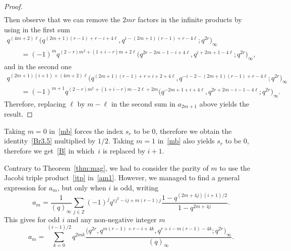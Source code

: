 \documentclass[pdftex]{sigma}
\numberwithin{equation}{section}
\begin{document}
\begin{proof}
\begin{align*}
\end{align*}
Then observe that we can remove the $2mr$ factors in the infinite products by using in the first sum
\begin{gather*}
q^{(4m+2)\ell}\bigl(q^{(2m+1)(r-1)+r-i+4\ell},q^{i-(2m+1)(r-1)+r-4\ell};q^{2r}\bigr)_\infty\\
\qquad=(-1)^mq^{(2-r)m^2+(1+i-r)m+2\ell}\bigl(q^{2r-2m-1-i+4\ell},q^{i+2m+1-4\ell};q^{2r}\bigr)_\infty,
\end{gather*}
and in the second one
\begin{gather*}
q^{(2m+1)(i+1)+(4m+2)\ell}\bigl(q^{(2m+1)(r-1)+r+i+2+4\ell},q^{-i-2-(2m+1)(r-1)+r-4\ell};q^{2r}\bigr)_\infty\\
\qquad=(-1)^{m+1}q^{(2-r)m^2+(1+i-r)m-2\ell+2m}\bigl(q^{-2m+1+i+4\ell},q^{2r+2m-i-1-4\ell};q^{2r}\bigr)_\infty.
\end{gather*}
Therefore, replacing $\ell$ by $m-\ell$ in the second sum in $a_{2m+1}$ above yields the result.
\end{proof}

 Taking $m=0$ in~\eqref{mb} forces the index $s_r$ to be $0$, therefore we obtain the identity~\eqref{Br3.5} multiplied by $1/2$. Taking $m=1$ in~\eqref{mb} also yields $s_r$ to be $0$, therefore we get~\eqref{B} in which~$i$ is replaced by $i+1$.

\begin{Remark}\label{rk:iodd}
Contrary to Theorem~\ref{thm:mag}, we had to consider the parity of $m$ to use the Jacobi triple product~\eqref{jtp} in~\eqref{am1}. However, we managed to find a general expression for $a_m$, but only when $i$ is odd, writing
\begin{equation*}a_m=\frac{1}{(q)_\infty}\sum_{j\in\mathbb{Z}}(-1)^jq^{rj^2-ij+m(r-1)j}\frac{1-q^{(2m+4j)(i+1)/2}}{1-q^{2m+4j}}.
\end{equation*}
This gives for odd $i$ and any non-negative integer $m$
\begin{equation*}a_m=\sum_{k=0}^{(i-1)/2}q^{2mk}\frac{\bigl(q^{2r},q^{m(r-1)+r-i+4k},q^{r+i-m(r-1)-4k};q^{2r}\bigr)_\infty}{(q)_\infty}.
\end{equation*}
\end{Remark}


\end{document}
